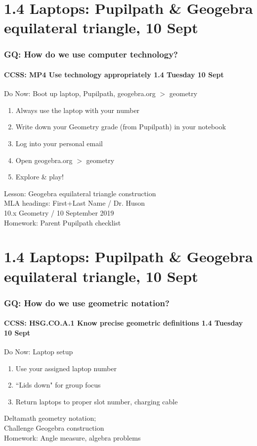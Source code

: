 \documentclass{beamer}
\begin{document}
  \section{1.4 Laptops: Pupilpath \& Geogebra equilateral triangle, 10 Sept}
    \frame
    {
      \frametitle{GQ: How do we use computer technology?}
      \framesubtitle{CCSS: MP4 Use technology appropriately \hfill \alert{1.4 Tuesday 10 Sept}}
    
      \begin{block}{Do Now: Boot up laptop, Pupilpath, geogebra.org $>$ geometry}
      \begin{enumerate}
          \item Always use the laptop with your number
          \item Write down your Geometry grade (from Pupilpath) in your notebook
          \item Log into your personal email
          \item Open geogebra.org $>$ geometry
          \item Explore \& play!\\
      \end{enumerate}
      \end{block}
      Lesson: Geogebra equilateral triangle construction\\
      MLA headings: First+Last Name / Dr. Huson \\
      10.x Geometry / 10 September 2019 \\ \vspace{0.25cm}
      Homework: Parent Pupilpath checklist
    }
    
\section{1.4 Laptops: Pupilpath \& Geogebra equilateral triangle, 10 Sept}
  \frame
  {
    \frametitle{GQ: How do we use geometric notation?}
    \framesubtitle{CCSS: HSG.CO.A.1 Know precise geometric definitions \hfill \alert{1.4 Tuesday 10 Sept}}

    \begin{block}{Do Now: Laptop setup}
    \begin{enumerate}
        \item Use your assigned laptop number
        \item ``Lids down" for group focus
        \item Return laptops to proper slot number, charging cable
    \end{enumerate}
    \end{block}
    Deltamath geometry notation; \\Challenge Geogebra construction\\
    \vspace{1cm}
    Homework: Angle measure, algebra problems
  }
\end{document}
